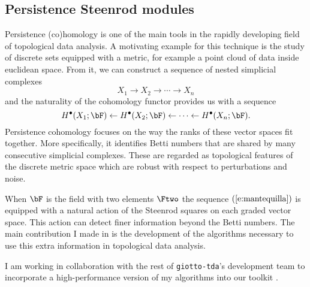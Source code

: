 \subsection{Persistence Steenrod modules}

Persistence (co)homology is one of the main tools in the rapidly developing field of topological data analysis.
A motivating example for this technique is the study of discrete sets equipped with a metric, for example a point cloud of data inside euclidean space.
From it, we can construct a sequence of nested simplicial complexes
\begin{equation*}
X_1 \to X_2 \to \cdots \to X_n
\end{equation*}
and the naturality of the cohomology functor provides us with a sequence
\begin{equation} \label{e:mantequilla}
H^\bullet(X_1; \bF) \leftarrow H^\bullet(X_2; \bF) \leftarrow \cdots \leftarrow H^\bullet(X_n; \bF).
\end{equation}
Persistence cohomology focuses on the way the ranks of these vector spaces fit together.
More specifically, it identifies Betti numbers that are shared by many consecutive simplicial complexes.
These are regarded as topological features of the discrete metric space which are robust with respect to perturbations and noise.

When $\bF$ is the field with two elements $\Ftwo$ the sequence $(\ref{e:mantequilla})$ is equipped with a natural action of the Steenrod squares on each graded vector space.
This action can detect finer information beyond the Betti numbers.
The main contribution I made in \cite{medina2018persistence} is the development of the algorithms necessary to use this extra information in topological data analysis.

I am working in collaboration with the rest of \texttt{giotto-tda}'s development team to incorporate a high-performance version of my algorithms into our toolkit \cite{medina2021giotto}.